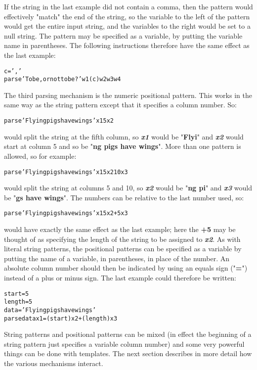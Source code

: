 If the string in the last example did not contain a comma, then
the pattern would effectively "match" the end of the string, so
the variable to the left of the pattern would get the entire input
string, and the variables to the right would be set to a null string.
 The pattern may be specified as a variable, by putting the variable
name in parentheses.  The following instructions therefore have the
same effect as the last example:
\begin{alltt}
c=','
parse 'To be, or not to be?' w1 (c) w2 w3 w4
\end{alltt}
 The third parsing mechanism is the numeric positional
pattern.
This works in the same way as the string pattern except that it
specifies a column number.  So:
\begin{alltt}
parse 'Flying pigs have wings' x1 5 x2
\end{alltt}
would split the string at the fifth column,
so \textbf{\emph{x1}} would be "\textbf{Flyi}"
and \textbf{\emph{x2}} would start at column 5 and
so be "\textbf{ng pigs have wings}".
 More than one pattern is allowed, so for example:
\begin{alltt}
parse 'Flying pigs have wings' x1 5 x2 10 x3
\end{alltt}
would split the string at columns 5 and 10,
so \textbf{\emph{x2}} would be
"\textbf{ng pi}" and \textbf{\emph{x3}} would be
"\textbf{gs have wings}".
 The numbers can be relative to the last number used, so:
\begin{alltt}
parse 'Flying pigs have wings' x1 5 x2 +5 x3
\end{alltt}
would have exactly the same effect as the last example; here
the \textbf{+5} may be thought of as specifying the length of the
string to be assigned to \textbf{\emph{x2}}.
 As with literal string patterns, the positional patterns can
be specified as a variable by putting the name of a variable, in
parentheses, in place of the number.
An absolute column number should then be indicated by using an equals
sign ("\textbf{=}") instead of a plus or minus sign.
The last example could therefore be written:
\begin{alltt}
start=5
length=5
data='Flying pigs have wings'
parse data  x1 =(start) x2 +(length) x3
\end{alltt}
 String patterns and positional patterns can be mixed (in effect the
beginning of a string pattern just specifies a variable column number)
and some very powerful things can be done with templates.
The next section describes in more detail how the various mechanisms
interact.
